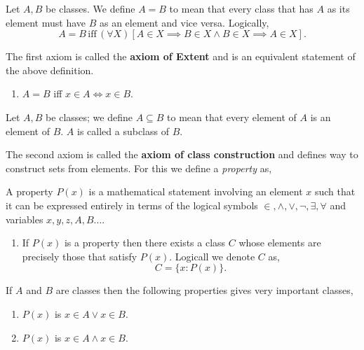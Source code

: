 \begin{Definition}
    Let $A,B$ be classes. We define $A = B$ to mean that every class that has $A$ as its element
    must have $B$ as an element and vice versa. Logically,
    \begin{equation*}
	A = B \, \text{iff} \, (\forall X)\left[ A \in X \implies B \in X \land B \in X \implies A \in X
	\right].
    \end{equation*}
\end{Definition}

The first axiom is called the \textbf{axiom of Extent} and is an equivalent statement of the above
definition.
\begin{enumerate}[label=\bfseries Axiom 1:]
    \item $A = B$ iff $x \in A \iff x \in B$.  
\end{enumerate}

\begin{Definition}
    Let $A,B$ be classes; we define $A \subseteq B$ to mean that every element of $A$ is an element of
    $B$. $A$ is called a subclass of $B$.
\end{Definition}

The second axiom is called the \textbf{axiom of class construction} and defines way to construct 
sets from elements. For this we define a \textit{property} as,
\begin{Definition}
    A property $P(x)$ is a mathematical statement involving an element $x$ such that it can be
    expressed entirely in terms of the logical symbols $\in, \land, \lor, \lnot, \exists, \forall$
    and variables $x,y,z,A,B \dots$. 
\end{Definition}

\begin{enumerate}[label=\bfseries Axiom 2:]
    \item If $P(x)$ is a property then there exists a class $C$ whose elements are precisely those
	that satisfy $P(x)$. Logicall we denote $C$ as,
	\begin{equation*}
	    C = \left.\lbrace x : P(x) \rbrace\right..
	\end{equation*}
\end{enumerate}

If $A$ and $B$ are classes then the following properties gives very important classes,
\begin{enumerate}
    \item $P(x)$ is $x \in A \lor x \in B$.
    \item $P(x)$ is $x \in A \land x \in B$.
\end{enumerate}

